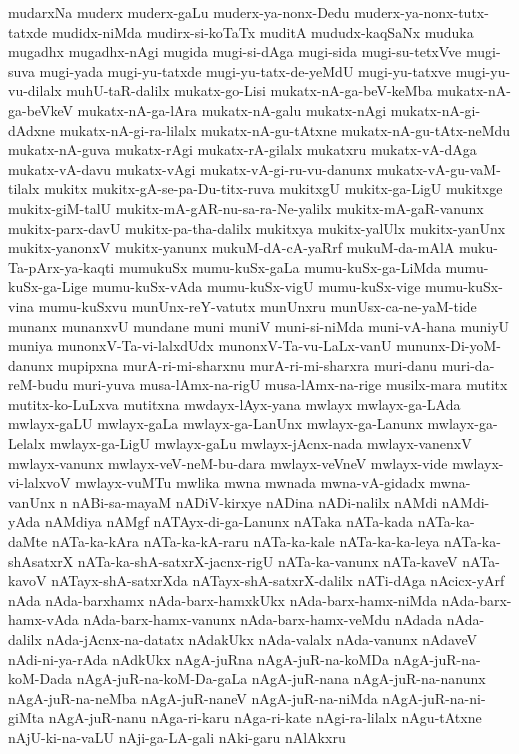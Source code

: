 {mudarxNa
muderx
muderx-gaLu
muderx-ya-nonx-Dedu
muderx-ya-nonx-tutx-tatxde
mudidx-niMda
mudirx-si-koTaTx
muditA
mududx-kaqSaNx
muduka
mugadhx
mugadhx-nAgi
mugida
mugi-si-dAga
mugi-sida
mugi-su-tetxVve
mugi-suva
mugi-yada
mugi-yu-tatxde
mugi-yu-tatx-de-yeMdU
mugi-yu-tatxve
mugi-yu-vu-dilalx
muhU-taR-dalilx
mukatx-go-Lisi
mukatx-nA-ga-beV-keMba
mukatx-nA-ga-beVkeV
mukatx-nA-ga-lAra
mukatx-nA-galu
mukatx-nAgi
mukatx-nA-gi-dAdxne
mukatx-nA-gi-ra-lilalx
mukatx-nA-gu-tAtxne
mukatx-nA-gu-tAtx-neMdu
mukatx-nA-guva
mukatx-rAgi
mukatx-rA-gilalx
mukatxru
mukatx-vA-dAga
mukatx-vA-davu
mukatx-vAgi
mukatx-vA-gi-ru-vu-danunx
mukatx-vA-gu-vaM-tilalx
mukitx
mukitx-gA-se-pa-Du-titx-ruva
mukitxgU
mukitx-ga-LigU
mukitxge
mukitx-giM-talU
mukitx-mA-gAR-nu-sa-ra-Ne-yalilx
mukitx-mA-gaR-vanunx
mukitx-parx-davU
mukitx-pa-tha-dalilx
mukitxya
mukitx-yalUlx
mukitx-yanUnx
mukitx-yanonxV
mukitx-yanunx
mukuM-dA-cA-yaRrf
mukuM-da-mAlA
muku-Ta-pArx-ya-kaqti
mumukuSx
mumu-kuSx-gaLa
mumu-kuSx-ga-LiMda
mumu-kuSx-ga-Lige
mumu-kuSx-vAda
mumu-kuSx-vigU
mumu-kuSx-vige
mumu-kuSx-vina
mumu-kuSxvu
munUnx-reY-vatutx
munUnxru
munUsx-ca-ne-yaM-tide
munanx
munanxvU
mundane
muni
muniV
muni-si-niMda
muni-vA-hana
muniyU
muniya
munonxV-Ta-vi-lalxdUdx
munonxV-Ta-vu-LaLx-vanU
mununx-Di-yoM-danunx
mupipxna
murA-ri-mi-sharxnu
murA-ri-mi-sharxra
muri-danu
muri-da-reM-budu
muri-yuva
musa-lAmx-na-rigU
musa-lAmx-na-rige
musilx-mara
mutitx
mutitx-ko-LuLxva
mutitxna
mwdayx-lAyx-yana
mwlayx
mwlayx-ga-LAda
mwlayx-gaLU
mwlayx-gaLa
mwlayx-ga-LanUnx
mwlayx-ga-Lanunx
mwlayx-ga-Lelalx
mwlayx-ga-LigU
mwlayx-gaLu
mwlayx-jAcnx-nada
mwlayx-vanenxV
mwlayx-vanunx
mwlayx-veV-neM-bu-dara
mwlayx-veVneV
mwlayx-vide
mwlayx-vi-lalxvoV
mwlayx-vuMTu
mwlika
mwna
mwnada
mwna-vA-gidadx
mwna-vanUnx
n
nABi-sa-mayaM
nADiV-kirxye
nADina
nADi-nalilx
nAMdi
nAMdi-yAda
nAMdiya
nAMgf
nATAyx-di-ga-Lanunx
nATaka
nATa-kada
nATa-ka-daMte
nATa-ka-kAra
nATa-ka-kA-raru
nATa-ka-kale
nATa-ka-ka-leya
nATa-ka-shAsatxrX
nATa-ka-shA-satxrX-jacnx-rigU
nATa-ka-vanunx
nATa-kaveV
nATa-kavoV
nATayx-shA-satxrXda
nATayx-shA-satxrX-dalilx
nATi-dAga
nAcicx-yArf
nAda
nAda-barxhamx
nAda-barx-hamxkUkx
nAda-barx-hamx-niMda
nAda-barx-hamx-vAda
nAda-barx-hamx-vanunx
nAda-barx-hamx-veMdu
nAdada
nAda-dalilx
nAda-jAcnx-na-datatx
nAdakUkx
nAda-valalx
nAda-vanunx
nAdaveV
nAdi-ni-ya-rAda
nAdkUkx
nAgA-juRna
nAgA-juR-na-koMDa
nAgA-juR-na-koM-Dada
nAgA-juR-na-koM-Da-gaLa
nAgA-juR-nana
nAgA-juR-na-nanunx
nAgA-juR-na-neMba
nAgA-juR-naneV
nAgA-juR-na-niMda
nAgA-juR-na-ni-giMta
nAgA-juR-nanu
nAga-ri-karu
nAga-ri-kate
nAgi-ra-lilalx
nAgu-tAtxne
nAjU-ki-na-vaLU
nAji-ga-LA-gali
nAki-garu
nAlAkxru
}
